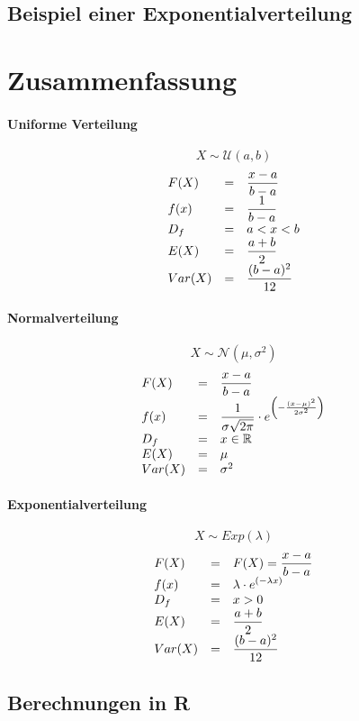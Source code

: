\subsection{Beispiel einer Exponentialverteilung}

\newpage
\section{Zusammenfassung}
\paragraph{Uniforme Verteilung}
\[ X \sim \mathcal{U}(a,b) \]
\[ \begin{array}{l c l}
	F(X) 
		& =
		& \displaystyle \frac{x-a}{b-a} \\
	f(x)	
		& =
		& \displaystyle \frac{1}{b-a}  \\
	D_f	
		& = 
		& a < x < b \\
	E(X)
		& = 
		& \displaystyle \frac{a+b}{2}\\
	Var(X)	
		& =
		& \displaystyle \frac{(b-a)^2}{12}\\
\end{array} \]

\paragraph{Normalverteilung}
\[ X \sim \mathcal{N}(\mu, \sigma^2) \]
\[ \begin{array}{l c l}
	F(X) 
		& =
		& \displaystyle \frac{x-a}{b-a} \\
	f(x)	
		& =
		& \displaystyle \frac{1}{\sigma\sqrt{2\pi}} \cdot
				e^{\left(
					-\frac{(x-\mu)^2}{2\sigma^2}
				\right)} \\
	D_f	
		& = 
		& x \in \mathbb{R} \\
	E(X)
		& = 
		& \mu\\
	Var(X)	
		& =
		& \sigma^2 \\
\end{array} \]

\paragraph{Exponentialverteilung}
\[ X \sim Exp(\lambda) \]
\[ \begin{array}{l c l}
	F(X) 
		& =
		& F(X) = \displaystyle \frac{x-a}{b-a} \\
	f(x)	
		& =
		& \displaystyle \lambda \cdot 
				e^{\left(
					-\lambda x
				\right)} \\
	D_f	
		& = 
		& x > 0 \\
	E(X)
		& = 
		& \displaystyle \frac{a+b}{2}\\
	Var(X)	
		& =
		& \displaystyle \frac{(b-a)^2}{12}\\
\end{array} \]


\subsection{Berechnungen in R}
